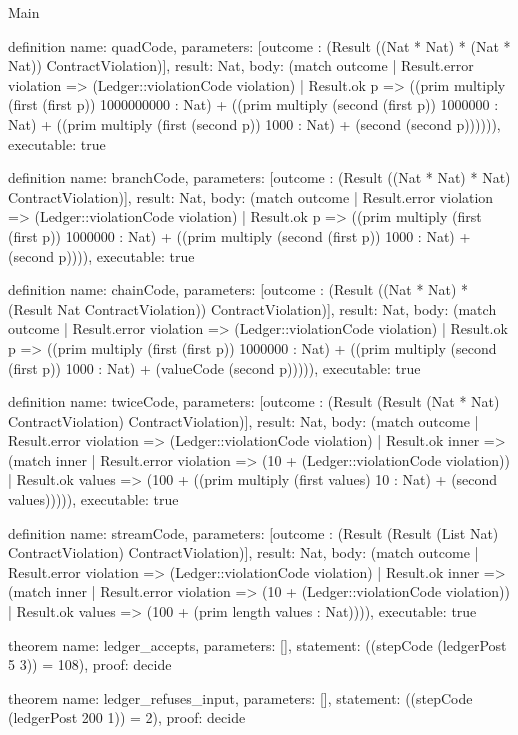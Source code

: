 \begin{lexlean}{Main}
\begin{semanticmodule}
definition{
  name: quadCode,
  parameters: [outcome : (Result ((Nat * Nat) * (Nat * Nat)) ContractViolation)],
  result: Nat,
  body: (match outcome
    | Result.error violation => (Ledger::violationCode violation)
    | Result.ok p => ((prim multiply (first (first p)) 1000000000 : Nat) + ((prim multiply (second (first p)) 1000000 : Nat) + ((prim multiply (first (second p)) 1000 : Nat) + (second (second p)))))),
  executable: true
}

definition{
  name: branchCode,
  parameters: [outcome : (Result ((Nat * Nat) * Nat) ContractViolation)],
  result: Nat,
  body: (match outcome
    | Result.error violation => (Ledger::violationCode violation)
    | Result.ok p => ((prim multiply (first (first p)) 1000000 : Nat) + ((prim multiply (second (first p)) 1000 : Nat) + (second p)))),
  executable: true
}

definition{
  name: chainCode,
  parameters: [outcome : (Result ((Nat * Nat) * (Result Nat ContractViolation)) ContractViolation)],
  result: Nat,
  body: (match outcome
    | Result.error violation => (Ledger::violationCode violation)
    | Result.ok p => ((prim multiply (first (first p)) 1000000 : Nat) + ((prim multiply (second (first p)) 1000 : Nat) + (valueCode (second p))))),
  executable: true
}

definition{
  name: twiceCode,
  parameters: [outcome : (Result (Result (Nat * Nat) ContractViolation) ContractViolation)],
  result: Nat,
  body: (match outcome
    | Result.error violation => (Ledger::violationCode violation)
    | Result.ok inner => (match inner
      | Result.error violation => (10 + (Ledger::violationCode violation))
      | Result.ok values => (100 + ((prim multiply (first values) 10 : Nat) + (second values))))),
  executable: true
}

definition{
  name: streamCode,
  parameters: [outcome : (Result (Result (List Nat) ContractViolation) ContractViolation)],
  result: Nat,
  body: (match outcome
    | Result.error violation => (Ledger::violationCode violation)
    | Result.ok inner => (match inner
      | Result.error violation => (10 + (Ledger::violationCode violation))
      | Result.ok values => (100 + (prim length values : Nat)))),
  executable: true
}

theorem{
  name: ledger_accepts,
  parameters: [],
  statement: ((stepCode (ledgerPost 5 3)) = 108),
  proof: decide{}
}

theorem{
  name: ledger_refuses_input,
  parameters: [],
  statement: ((stepCode (ledgerPost 200 1)) = 2),
  proof: decide{}
}


\end{semanticmodule}
\end{lexlean}

